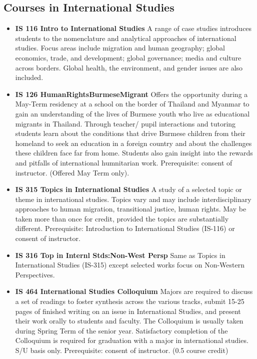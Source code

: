 \documentclass[
  letterpaper,
]{scrbook}
\providecommand{\tightlist}{%
  \setlength{\itemsep}{0pt}\setlength{\parskip}{0pt}}
\begin{document}
\hypertarget{courses-in-international-studies}{%
\subsection{Courses in International
Studies}\label{courses-in-international-studies}}

\begin{itemize}
\tightlist
\item
  \textbf{IS 116 Intro to International Studies} A range of case studies
  introduces students to the nomenclature and analytical approaches of
  international studies. Focus areas include migration and human
  geography; global economics, trade, and development; global
  governance; media and culture across borders. Global health, the
  environment, and gender issues are also included.
\item
  \textbf{IS 126 HumanRightsBurmeseMigrant} Offers the opportunity
  during a May-Term residency at a school on the border of Thailand and
  Myanmar to gain an understanding of the lives of Burmese youth who
  live as educational migrants in Thailand. Through teacher/ pupil
  interactions and tutoring students learn about the conditions that
  drive Burmese children from their homeland to seek an education in a
  foreign country and about the challenges these children face far from
  home. Students also gain insight into the rewards and pitfalls of
  international humnitarian work. Prerequisite: consent of instructor.
  (Offered May Term only).
\item
  \textbf{IS 315 Topics in International Studies} A study of a selected
  topic or theme in international studies. Topics vary and may include
  interdisciplinary approaches to human migration, transitional justice,
  human rights. May be taken more than once for credit, provided the
  topics are substantially different. Prerequisite: Introduction to
  International Studies (IS-116) or consent of instructor.
\item
  \textbf{IS 316 Top in Internl Stds:Non-West Persp} Same as Topics in
  International Studies (IS-315) except selected works focus on
  Non-Western Perspectives.
\item
  \textbf{IS 464 International Studies Colloquium} Majors are required
  to discuss a set of readings to foster synthesis across the various
  tracks, submit 15-25 pages of finished writing on an issue in
  International Studies, and present their work orally to students and
  faculty. The Colloquium is usually taken during Spring Term of the
  senior year. Satisfactory completion of the Colloquium is required for
  graduation with a major in international studies. S/U basis only.
  Prerequisite: consent of instructor. (0.5 course credit)
\end{itemize}
\end{document}
